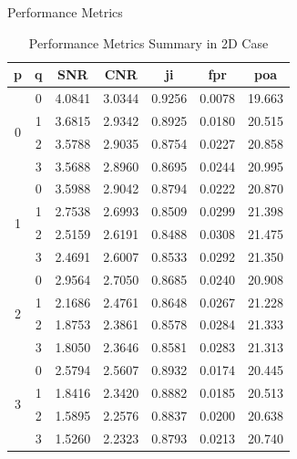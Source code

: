 \documentclass{beamer}
\begin{document}
\begin{frame}{Performance Metrics}
\begin{table}
\centering
\caption{Performance Metrics Summary in 2D Case}
\begin{tabular}{ccccccc}
\hline
\textbf{p} & \textbf{q} & \textbf{SNR} & \textbf{CNR} & \gls{ji} & \gls{fpr} & \gls{poa} \\ \hline
\multirow{4}{*}{0} & 0 & 4.0841 & 3.0344 & 0.9256 & 0.0078 & 19.663 \\
 & 1 & 3.6815 & 2.9342 & 0.8925 & 0.0180 & 20.515 \\
 & 2 & 3.5788 & 2.9035 & 0.8754 & 0.0227 & 20.858 \\
 & 3 & 3.5688 & 2.8960 & 0.8695 & 0.0244 & 20.995 \\ \hline
\multirow{4}{*}{1} & 0 & 3.5988 & 2.9042 & 0.8794 & 0.0222 & 20.870 \\
 & 1 & 2.7538 & 2.6993 & 0.8509 & 0.0299 & 21.398 \\
 & 2 & 2.5159 & 2.6191 & 0.8488 & 0.0308 & 21.475 \\
 & 3 & 2.4691 & 2.6007 & 0.8533 & 0.0292 & 21.350 \\ \hline
\multirow{4}{*}{2} & 0 & 2.9564 & 2.7050 & 0.8685 & 0.0240 & 20.908 \\
 & 1 & 2.1686 & 2.4761 & 0.8648 & 0.0267 & 21.228 \\
 & 2 & 1.8753 & 2.3861 & 0.8578 & 0.0284 & 21.333 \\
 & 3 & 1.8050 & 2.3646 & 0.8581 & 0.0283 & 21.313 \\ \hline
\multirow{4}{*}{3} & 0 & 2.5794 & 2.5607 & 0.8932 & 0.0174 & 20.445 \\
 & 1 & 1.8416 & 2.3420 & 0.8882 & 0.0185 & 20.513 \\
 & 2 & 1.5895 & 2.2576 & 0.8837 & 0.0200 & 20.638 \\
 & 3 & 1.5260 & 2.2323 & 0.8793 & 0.0213 & 20.740 \\ \hline
\end{tabular}
\end{table}
\end{frame}
\end{document}
